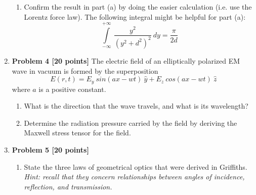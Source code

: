 \documentclass[fleqn]{article}
\begin{document}
\begin{enumerate}
\begin{enumerate}

      \item Confirm the result in part (a) by doing the easier calculation (i.e. use the Lorentz force law).
      The following integral might be helpful for part (a):
      $$
        \int\limits_{-\infty}^{+\infty} ~ \dfrac{y^2}{\left(y^2+d^2\right)^2} ~ dy=\dfrac{\pi}{2d} 
      $$


    \end{enumerate}

    \item \textbf{Problem 4 [20 points]} The electric field of an elliptically polarized EM wave in vacuum is formed by the superposition
      $$
        E(r,t)=E_y ~ sin(ax-wt) ~ \hat{y}+E_z ~ cos(ax-wt) ~ \hat{z}
      $$
      where $a$ is a positive constant.
      \begin{enumerate}
        \item What is the direction that the wave travels, and what is its wavelength?


        \item Determine the radiation pressure carried by the field by deriving the Maxwell stress tensor for
        the field.

        
      \end{enumerate}

    \item \textbf{Problem 5 [20 points]}
    \begin{enumerate}
      \item State the three laws of geometrical optics that were derived in Griffiths. \emph{Hint: recall that they
      concern relationships between angles of incidence, reflection, and transmission.}


\end{enumerate}
\end{enumerate}
\end{document}

